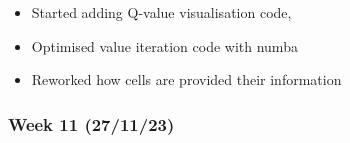 \begin{itemize}
        \begin{itemize}
          \tightlist
          \item
                Started adding Q-value visualisation code,
          \item
                Optimised value iteration code with numba
          \item
                Reworked how cells are provided their information
        \end{itemize}
\end{itemize}

\hypertarget{week-11-271123}{%
  \subsubsection{Week 11 (27/11/23)}\label{week-11-271123}}

